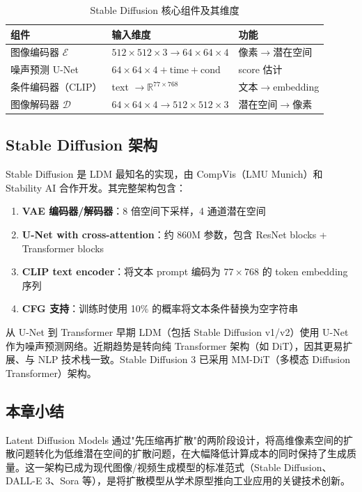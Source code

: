 \begin{table}[H]
\centering
\begin{tabular}{lll}
\toprule
\textbf{组件} & \textbf{输入维度} & \textbf{功能} \\
\midrule
图像编码器 $\mathcal{E}$ & $512\times512\times3 \to 64\times64\times4$ & 像素$\to$潜在空间 \\
噪声预测 U-Net & $64\times64\times4 + \text{time} + \text{cond}$ & score 估计 \\
条件编码器（CLIP） & text $\to \mathbb{R}^{77\times768}$ & 文本$\to$embedding \\
图像解码器 $\mathcal{D}$ & $64\times64\times4 \to 512\times512\times3$ & 潜在空间$\to$像素 \\
\bottomrule
\end{tabular}
\caption{Stable Diffusion 核心组件及其维度}
\end{table}

\subsection{Stable Diffusion 架构}

Stable Diffusion 是 LDM 最知名的实现，由 CompVis（LMU Munich）和 Stability AI 合作开发。其完整架构包含：

\begin{enumerate}
    \item \textbf{VAE 编码器/解码器}：8 倍空间下采样，4 通道潜在空间
    \item \textbf{U-Net with cross-attention}：约 860M 参数，包含 ResNet blocks + Transformer blocks
    \item \textbf{CLIP text encoder}：将文本 prompt 编码为 $77\times768$ 的 token embedding 序列
    \item \textbf{CFG 支持}：训练时使用 10\% 的概率将文本条件替换为空字符串
\end{enumerate}

\begin{knowledgebox}{从 U-Net 到 Transformer}
早期 LDM（包括 Stable Diffusion v1/v2）使用 U-Net 作为噪声预测网络。近期趋势是转向纯 Transformer 架构（如 DiT），因其更易扩展、与 NLP 技术栈一致。Stable Diffusion 3 已采用 MM-DiT（多模态 Diffusion Transformer）架构。
\end{knowledgebox}

\subsection{本章小结}

Latent Diffusion Models 通过"先压缩再扩散"的两阶段设计，将高维像素空间的扩散问题转化为低维潜在空间的扩散问题，在大幅降低计算成本的同时保持了生成质量。这一架构已成为现代图像/视频生成模型的标准范式（Stable Diffusion、DALL-E 3、Sora 等），是将扩散模型从学术原型推向工业应用的关键技术创新。

\newpage
